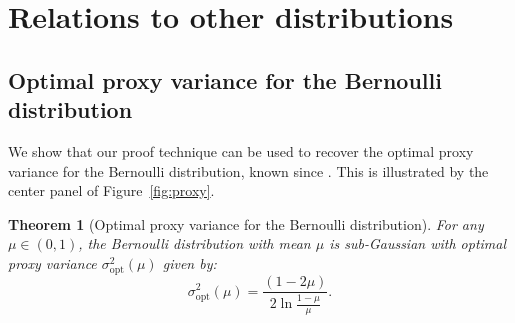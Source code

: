 \documentclass[15pt]{article}
\theoremstyle{plain}
\newtheorem{thm}{{Theorem}}%
\begin{document}
\section{Relations to other distributions\label{sec:dir}}


\subsection{Optimal proxy variance for the Bernoulli distribution}

We show that our proof technique can be used to recover the optimal proxy variance for the Bernoulli distribution, known since \cite{kearns1998large}. This is illustrated by the center panel of Figure~\ref{fig:proxy}.

\begin{thm}[Optimal proxy variance for the Bernoulli distribution]\label{thm:3}
For any $\mu\in(0,1)$, the Bernoulli distribution with mean $\mu$ is sub-Gaussian with optimal proxy variance $\sigma_{\text{opt}}^2(\mu)$ given by:
\begin{equation}\label{eq:def_sig_mu}
        \sigma_{\text{opt}}^2(\mu)= \frac{(1-2\mu)}{2\ln \frac{1-\mu}{\mu}}.
\end{equation}
%
\end{thm}
\end{document}
